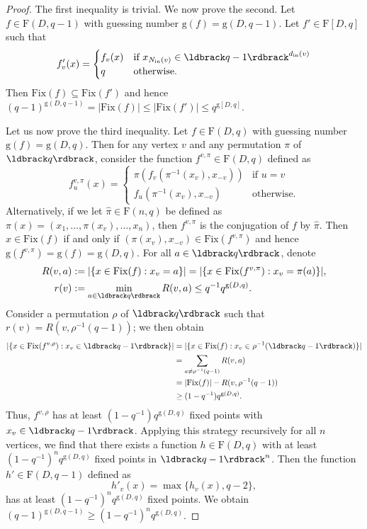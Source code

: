 \documentclass[a4paper, 11pt]{book}
\numberwithin{equation}{section}
\theoremstyle{plain}
\newcommand{\neighbourhood}{N}
\newcommand{\degree}{d}
\newcommand{\inn}[1]{#1_\mathrm{in}}
\newcommand{\NIn}{\inn{\neighbourhood}}
\newcommand{\dIn}{\inn{\degree}}
\newcommand{\functions}{\mathrm{F}}
\newcommand{\Fix}{\mathrm{Fix}}
\newcommand{\guessing}{\mathrm{g}}
\renewcommand{\(}{\ldbrack}
\renewcommand{\)}{\rdbrack}
\begin{document}
\begin{proof}
The first inequality is trivial. We now prove the second. Let $f \in \functions(D,q-1)$ with guessing number $\guessing(f) = \guessing(D, q-1)$. Let $f'\in \functions[D,q]$ such that 
\[
	f'_v(x) = \begin{cases} 
	f_v(x) & \mbox{if } x_{\NIn(v)} \in \(q-1\)^{\dIn(v)}\\
	q & \mbox{otherwise}.
	\end{cases}
\]
Then $\Fix(f) \subseteq \Fix(f')$ and hence $(q-1)^{\guessing(D, q-1)} = |\Fix(f)| \le |\Fix(f')| \le q^{\guessing[D,q]}$.

Let us now prove the third inequality. Let $f \in \functions(D,q)$ with guessing number $\guessing(f) = \guessing(D,q)$. Then for any vertex $v$ and any permutation $\pi$ of $\(q\)$, consider the function $f^{v,\pi} \in \functions(D,q)$ defined as 
\[
	f^{v,\pi}_u(x) = \begin{cases}
	\pi( f_v( \pi^{-1}(x_v), x_{- v})) & \mbox{if } u=v\\
	f_u( \pi^{-1}(x_v), x_{- v}) & \mbox{otherwise}.
	\end{cases}
\]
Alternatively, if we let $\hat{\pi} \in \functions(n,q)$ be defined as $\pi(x) = (x_1, \dots, \pi(x_v), \dots, x_n)$, then $f^{v, \pi}$ is the conjugation of $f$ by $\hat{\pi}$. Then $x \in \Fix(f)$ if and only if $(\pi(x_v),x_{- v}) \in \Fix(f^{v,\pi})$ and hence $\guessing(f^{v,\pi}) = \guessing(f) = \guessing(D,q)$. For all $a \in \(q\)$, denote
\begin{align*}
	R(v,a) 	&:= |\{ x \in \Fix(f) : x_v = a \}| = |\{ x \in \Fix(f^{v,\pi}) : x_v = \pi(a) \}|,\\
	r(v)	&:= \min_{a \in \(q\)} R(v,a) \le q^{-1} q^{\guessing(D,q)}.
\end{align*}
Consider a permutation $\rho$ of $\(q\)$ such that $r(v) = R(v,\rho^{-1}(q-1))$;  we then obtain 
\begin{align*}
	|\{ x \in \Fix(f^{v,\rho}) : x_v \in \(q-1\)\}| &= |\{ x \in \Fix(f) : x_v \in \rho^{-1}( \(q-1\) )\}| \\
	&=  \sum_{a \ne \rho^{-1}(q-1)} R(v,a) \\
	&=  |\Fix(f)| - R(v,\rho^{-1}(q-1))\\
	&\ge (1 - q^{-1}) q^{\guessing(D,q)}.
\end{align*}
Thus, $f^{v,\rho}$ has at least $(1 - q^{-1}) q^{\guessing(D,q)}$ fixed points with $x_v \in \(q-1\)$. Applying this strategy recursively for all $n$ vertices, we find that there exists a function $h \in \functions(D, q)$ with at least $(1-q^{-1})^n q^{\guessing(D,q)}$ fixed points in $\(q-1\)^n$. Then the function $h' \in \functions(D, q-1)$ defined as
\[
	h'_v(x) = \max\{ h_v(x), q-2 \},
\]
has at least $(1-q^{-1})^n q^{\guessing(D,q)}$ fixed points. We obtain $(q-1)^{\guessing(D, q-1)} \ge (1-q^{-1})^n q^{\guessing(D,q)}$.
\end{proof}
\end{document}
